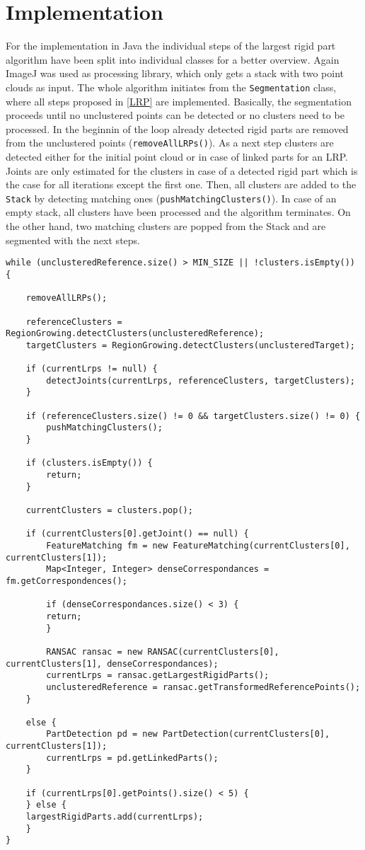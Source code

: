 
\section{Implementation}
\label{ImplementationLRP}
For the implementation in Java the individual steps of the largest rigid part algorithm have been split into individual classes for a better overview. Again ImageJ was used as processing library, which only gets a stack with two point clouds as input.
%
%
The whole algorithm initiates from the \texttt{Segmentation} class, where all steps proposed in \ref{LRP} are implemented. Basically, the segmentation proceeds until no unclustered points can be detected or no clusters need to be processed. In the beginnin of the loop already detected rigid parts are removed from the unclustered points (\texttt{removeAllLRPs()}). As a next step clusters are detected either for the initial point cloud or in case of linked parts for an LRP. Joints are only estimated for the clusters in case of a detected rigid part which is the case for all iterations except the first one. Then, all clusters are added to the \texttt{Stack} by detecting matching ones (\texttt{pushMatchingClusters()}). In case of an empty stack, all clusters have been processed and the algorithm terminates. On the other hand, two matching clusters are popped from the Stack and are segmented with the next steps.

\begin{lstlisting}
while (unclusteredReference.size() > MIN_SIZE || !clusters.isEmpty()) {

	removeAllLRPs();

	referenceClusters = RegionGrowing.detectClusters(unclusteredReference);
	targetClusters = RegionGrowing.detectClusters(unclusteredTarget);

	if (currentLrps != null) {
		detectJoints(currentLrps, referenceClusters, targetClusters);
	}

	if (referenceClusters.size() != 0 && targetClusters.size() != 0) {
		pushMatchingClusters();
	}

	if (clusters.isEmpty()) {
		return;
	}

	currentClusters = clusters.pop();

	if (currentClusters[0].getJoint() == null) {
		FeatureMatching fm = new FeatureMatching(currentClusters[0], currentClusters[1]);
		Map<Integer, Integer> denseCorrespondances = fm.getCorrespondences();

		if (denseCorrespondances.size() < 3) {
		return;
		}

		RANSAC ransac = new RANSAC(currentClusters[0], currentClusters[1], denseCorrespondances);
		currentLrps = ransac.getLargestRigidParts();
		unclusteredReference = ransac.getTransformedReferencePoints();
	}

	else {
		PartDetection pd = new PartDetection(currentClusters[0], currentClusters[1]);
		currentLrps = pd.getLinkedParts();
	}

	if (currentLrps[0].getPoints().size() < 5) {
	} else {
	largestRigidParts.add(currentLrps);
	}
}
\end{lstlisting}

